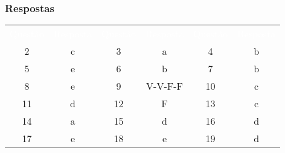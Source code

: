 \documentclass[	aspectratio=169,
				xcolor=table]{beamer}
\begin{document}
	
	\begin{frame}
		\frametitle{Respostas}
		
		\begin{eftable}
			\begin{tabular}{c c | c c | c c}
			\textcolor{white}{Questão} & \textcolor{white}{Resposta} & 
			\textcolor{white}{Questão} & \textcolor{white}{Resposta} & 
			\textcolor{white}{Questão} & \textcolor{white}{Resposta} \\
			2 & c & 3 & a & 4 & b \\ 
			5 & e & 6 & b & 7 & b \\
			8 & e & 9 & V-V-F-F & 10 & c \\			
			11 & d & 12 & F & 13 & c \\		
			14 & a & 15 & d & 16 & d \\		
			17 & e & 18 & e & 19 & d \\		
			\end{tabular}
		\end{eftable}
	\end{frame}
	
\end{document}
